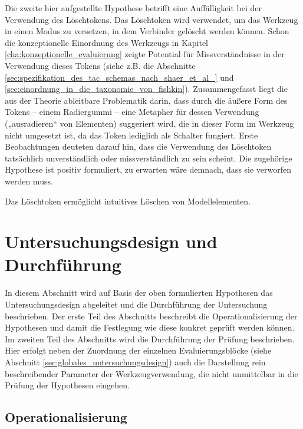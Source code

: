 Die zweite hier aufgestellte Hypothese betrifft eine Auffälligkeit bei der Verwendung des Löschtokens. Das Löschtoken wird verwendet, um das Werkzeug in einen Modus zu versetzen, in dem Verbinder gelöscht werden können. Schon die konzeptionelle Einordnung des Werkzeugs in Kapitel \ref{cha:konzeptionelle_evaluierung} zeigte Potential für Missverständnisse in der Verwendung dieses Tokens (siehe z.B. die Abschnitte \ref{sec:spezifikation_des_tac_schemas_nach_shaer_et_al_} und \ref{sec:einordnung_in_die_taxonomie_von_fishkin}). Zusammengefasst liegt die aus der Theorie ableitbare Problematik darin, dass durch die äußere Form des Tokens -- einem Radiergummi -- eine Metapher für dessen Verwendung („ausradieren“ von Elementen) suggeriert wird, die in dieser Form im Werkzeug nicht umgesetzt ist, da das Token lediglich als Schalter fungiert. Erste Beobachtungen deuteten darauf hin, dass die Verwendung des Löschtoken tatsächlich unverständlich oder missverständlich zu sein scheint. Die zugehörige Hypothese ist positiv formuliert, zu erwarten wäre demnach, dass sie verworfen werden muss.

\begin{hyp}
	\label{hyp:radierer}
	Das Löschtoken ermöglicht intuitives Löschen von Modellelementen.
\end{hyp}


\section{Untersuchungsdesign und Durchführung} %
\label{sec:untersuchungsdesign}

In diesem Abschnitt wird auf Basis der oben formulierten Hypothesen das Untersuchungsdesign abgeleitet und die Durchführung der Untersuchung beschrieben. Der erste Teil des Abschnitts beschreibt die Operationalisierung der Hypothesen und damit die Festlegung wie diese konkret geprüft werden können. Im zweiten Teil des Abschnitts wird die Durchführung der Prüfung beschrieben. Hier erfolgt neben der Zuordnung der einzelnen Evaluierungsblöcke (siehe Abschnitt \ref{sec:globales_untersuchungsdesign}) auch die Darstellung rein beschreibender Parameter der Werkzeugverwendung, die nicht unmittelbar in die Prüfung der Hypothesen eingehen. 

\subsection{Operationalisierung} %
\label{sub:operationalisierung}

